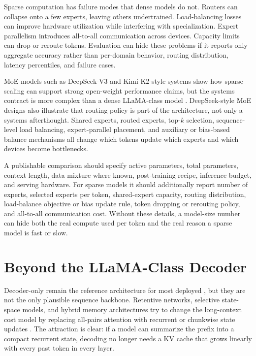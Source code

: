 Sparse computation has failure modes that dense models do not. Routers can collapse onto a few experts, leaving others undertrained. Load-balancing losses can improve hardware utilization while interfering with specialization. Expert parallelism introduces all-to-all communication across devices. Capacity limits can drop or reroute tokens. Evaluation can hide these problems if it reports only aggregate accuracy rather than per-domain behavior, routing distribution, latency percentiles, and failure cases.

MoE models such as DeepSeek-V3 and Kimi K2-style systems show how sparse scaling can support strong open-weight performance claims, but the systems contract is more complex than a dense LLaMA-class model \cite{deepseek2024v3,kimi2025k2}. DeepSeek-style MoE designs also illustrate that routing policy is part of the architecture, not only a systems afterthought. Shared experts, routed experts, top-$k$ selection, sequence-level load balancing, expert-parallel placement, and auxiliary or bias-based balance mechanisms all change which tokens update which experts and which devices become bottlenecks.

A publishable comparison should specify active parameters, total parameters, context length, data mixture where known, post-training recipe, inference budget, and serving hardware. For sparse models it should additionally report number of experts, selected experts per token, shared-expert capacity, routing distribution, load-balance objective or bias update rule, token dropping or rerouting policy, and all-to-all communication cost. Without these details, a model-size number can hide both the real compute used per token and the real reason a sparse model is fast or slow.

\section{Beyond the LLaMA-Class Decoder}
\label{sec:beyond-llama-class-decoder}

Decoder-only \transformers remain the reference architecture for most deployed \llms, but they are not the only plausible sequence backbone. Retentive networks, selective state-space models, and hybrid memory architectures try to change the long-context cost model by replacing all-pairs attention with recurrent or chunkwise state updates \cite{sun2023retnet,gu2023mamba,dao2024mamba2,behrouz2025titans}. The attraction is clear: if a model can summarize the prefix into a compact recurrent state, decoding no longer needs a KV cache that grows linearly with every past token in every layer.

